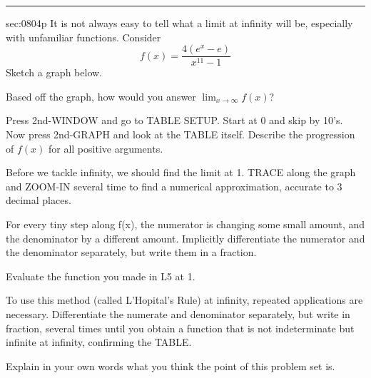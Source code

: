\renewcommand{\columnseprule}{1.5pt}
\begin{multicols*}{2}
\rule[0.5\baselineskip]{0.4\textwidth}{1pt}
\noindent
{}\label{sec:0804p}
\begin{exercises}{sec:0804p}
\lab{} It is not always easy to tell what a limit at infinity will be, especially with unfamiliar functions.  Consider 
$$
f(x) = \frac{4(e^x-e)}{x^{11}-1}
$$
Sketch a graph below.

\noindent
\begin{centering}
\end{centering}

\lab{} Based off the graph, how would you answer $\lim_{x\rightarrow\infty}f(x)$?

\vspace{1cm}
\lab{} Press 2nd-WINDOW and go to TABLE SETUP.  Start at 0 and skip by 10’s.  Now press 2nd-GRAPH and look at the TABLE itself.  Describe the progression of $f(x)$ for all positive arguments.

\vspace{3cm}
\lab{} Before we tackle infinity, we should find the limit at 1.  TRACE along the graph and ZOOM-IN several time to find a numerical approximation, accurate to 3 decimal places.

\vspace{2cm}
\lab{} For every tiny step along f(x), the numerator is changing some small amount, and the denominator by a different amount.  Implicitly differentiate the numerator and the denominator separately, but write them in a fraction.

\vspace{3cm}
\lab{} Evaluate the function you made in L5 at 1.

\vspace{2cm}
\lab{} To use this method (called L’Hopital’s Rule) at infinity, repeated applications are necessary.  Differentiate the numerate and denominator separately, but write in fraction, several times until you obtain a function that is not indeterminate but infinite at infinity, confirming the TABLE.

\vspace{3cm}
\lab{} Explain in your own words what you think the point of this problem set is.

\end{exercises}
\end{multicols*}